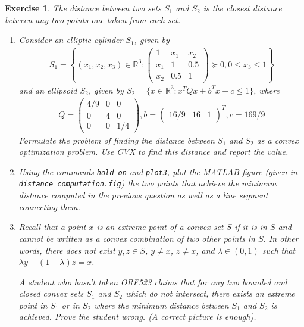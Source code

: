 \documentclass[12pt]{article}
\theoremstyle{colon}
\newtheorem{exercise}{Exercise}
\begin{document}
\begin{exercise}
  The distance between two sets $S_1$ and $S_2$ is the closest distance between any two points one taken from each set.
  \begin{enumerate}[label=\arabic*)]
    \item Consider an elliptic cylinder $S_1$, given by
      \begin{gather*}
        S_1 = \left\{ (x_1, x_2, x_3) \in \mathbb{R}^3 :
        \begin{pmatrix}
          1 & x_1 & x_2 \\
          x_1 & 1 & 0.5 \\
          x_2 & 0.5 & 1
        \end{pmatrix} \succeq 0, 0 \leq x_3 \leq 1 \right\}
      \end{gather*}
      and an ellipsoid $S_2$, given by $S_2 = \{ x \in \mathbb{R}^3 : x^T Q x + b^T x + c \leq 1 \}$, where
      \begin{gather*}
        Q = \begin{pmatrix}
          4/9 & 0 & 0 \\
          0 & 4 & 0 \\
          0 & 0 & 1/4
        \end{pmatrix}, b = \begin{pmatrix}
          16/9 & 16 & 1
        \end{pmatrix}^T, c = 169/9
      \end{gather*}
      Formulate the problem of finding the distance between $S_1$ and $S_2$ as a convex optimization problem. Use CVX to find this distance and report the value.

    \item Using the commands \texttt{hold on} and \texttt{plot3}, plot the MATLAB figure (given in \texttt{distance\_computation.fig}) the two points that achieve the minimum distance computed in the previous question as well as a line segment connecting them.

    \item Recall that a point $x$ is an \textit{extreme point} of a convex set $S$ if it is in $S$ and cannot be written as a convex combination of two other points in $S$. In other words, there does not exist $y, z \in S$, $y \neq x$, $z \neq x$, and $\lambda \in (0,1)$ such that $\lambda y + (1-\lambda)z = x$.

      A student who hasn't taken ORF523 claims that for any two bounded and closed convex sets $S_1$ and $S_2$ which do not intersect, there exists an extreme point in $S_1$ or in $S_2$ where the minimum distance between $S_1$ and $S_2$ is achieved. Prove the student wrong. (A correct picture is enough).
  \end{enumerate}
\end{exercise}
\end{document}

